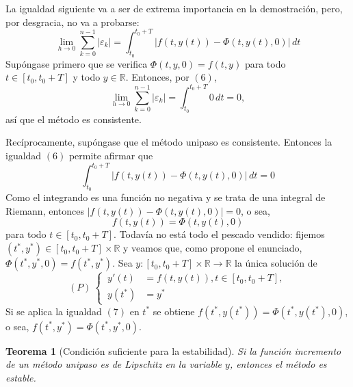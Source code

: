 \documentclass[11pt]{report}
\makeatletter
\renewenvironment{proof}[1][\proofname]{\par
  \pushQED{\qed}%
  \normalfont \topsep\z@skip %
  \trivlist
  \item[\hskip\labelsep
        \itshape
    #1\@addpunct{.}]\ignorespaces
}{%
  \popQED\endtrivlist\@endpefalse
}
\theoremstyle{mytheorem}
\newtheorem{theorem}{Teorema}
\theoremstyle{mydefinition}
\theoremstyle{myexample}
\let\oldproofname=\proofname
\renewcommand{\proofname}{\rm\bf{\oldproofname}}}
\newenvironment{ctheorem} %
  {\begin{mdframed}[
        linewidth=3pt,
        linecolor=c2,
        bottomline=false,
        topline=false,
        rightline=false,
        innerrightmargin=0pt,
        innertopmargin=0pt,
        innerbottommargin=0pt,
        innerleftmargin=1em, %
        skipabove=\baselineskip]
    \begin{theorem}}
  {\end{theorem}\end{mdframed}}
\newcommand{\R}{\mathbb R}
\makeatother
\begin{document}
\begin{proof}
La igualdad siguiente va a ser de extrema importancia en la demostración, pero, por desgracia, no va a probarse:
\begin{equation}\lim_{h\to 0} \sum_{k=0}^{n-1} |\varepsilon_k| = \int_{t_0}^{t_0+T} |f(t,y(t))-\Phi(t,y(t),0)| \, dt \end{equation}
Supóngase primero que se verifica $\Phi(t,y,0) = f(t,y)$ para todo $t \in [t_0,t_0+T]$ y todo $y \in \R$. Entonces, por $(6)$,
\[\lim_{h \to 0} \sum_{k=0}^{n-1} |\varepsilon_k| = \int_{t_0}^{t_0+T}0\, dt = 0,\]
así que el método es consistente.

Recíprocamente, supóngase que el método unipaso es consistente. Entonces la igualdad $(6)$ permite afirmar que
\[\int_{t_0}^{t_0+T} |f(t,y(t))-\Phi(t,y(t),0)| \, dt =0\]
Como el integrando es una función no negativa y se trata de una integral de Riemann, entonces $|f(t,y(t))-\Phi(t,y(t),0)| = 0$, o sea, \begin{equation}f(t,y(t)) = \Phi(t,y(t),0) \end{equation} para todo $t \in [t_0,t_0+T]$. Todavía no está todo el pescado vendido: fijemos $(t^*,y^*) \in [t_0,t_0+T] \times \R$ y veamos que, como propone el enunciado, $\Phi(t^*,y^*,0) = f(t^*,y^*)$. Sea $y \colon [t_0,t_0+T] \times \R \to \R$ la única solución de
\[(P) \ \left\{
\begin{alignedat}{1}
\, y'(t) &=f(t,y(t)), t \in [t_0,t_0+T], \\
\,   y(t^*)&=y^*
\end{alignedat}\right.\]
Si se aplica la igualdad $(7)$ en $t^*$ se obtiene $f(t^*,y(t^*)) = \Phi(t^*,y(t^*),0)$, o sea, $f(t^*,y^*) = \Phi(t^*,y^*,0)$.
\end{proof}

\begin{ctheorem}[Condición suficiente para la estabilidad]
\label{teo2.7}
Si la función incremento de un método unipaso es de Lipschitz en la variable $y$, entonces el método es estable.
\end{ctheorem}
\end{document}
